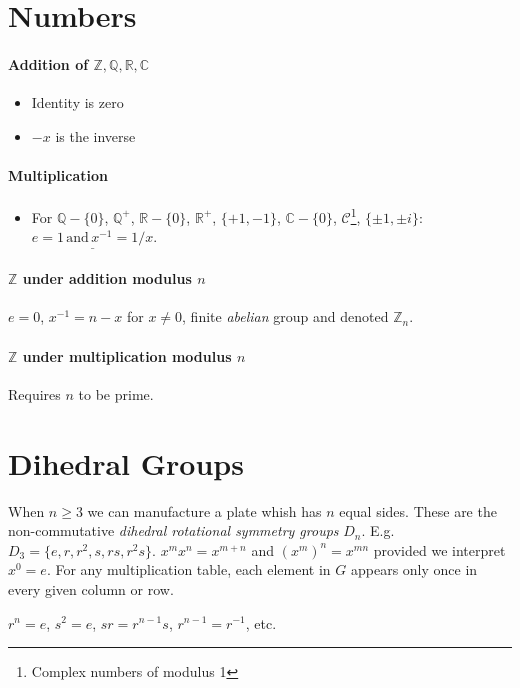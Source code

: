 \documentclass[a4paper,twocolumn,10pt]{article}
\begin{document}
  \section{Numbers}
  \paragraph{Addition of $\mathbb{Z}, \mathbb{Q}, \mathbb{R}, \mathbb{C}$}
  \begin{itemize}
    \item Identity is zero
    \item $-x$ is the inverse
  \end{itemize}
  \paragraph{Multiplication}
  \begin{itemize}
    \item For $\mathbb{Q}-\{0\}$, $\mathbb{Q}^+$, $\mathbb{R}-\{0\}$,
      $\mathbb{R}^+$,
      $\{+1,-1\}$, $\mathbb{C}-\{0\}$, $\mathcal{C}$\footnote{Complex numbers of
      modulus 1}, $\{\pm 1, \pm i\}$: $\underline{e=1 \,\text{and}\, x^{-1}=1/x}$.
  \end{itemize}

  \paragraph{$\mathbb{Z}$ under addition modulus $n$} $e=0$,
  $x^{-1}=n-x$ for $x\ne0$, finite \textit{abelian} group and denoted
  $\mathbb{Z}_n$.

  \paragraph{$\mathbb{Z}$ under multiplication modulus $n$} Requires $n$ to be
  prime.

  \section{Dihedral Groups}
  When $n\geqslant3$ we can manufacture a plate whish has $n$ equal sides. These are
  the non-commutative \textit{dihedral rotational symmetry groups} $D_n$. E.g.
  $D_3 = \{e,r,r^2,s,rs,r^2s\}$. $x^mx^n=x^{m+n}$ and $(x^m)^n=x^{mn}$ provided
  we interpret $x^0=e$. For any multiplication table, each element in $G$
  appears only once in every given column or row.

  $r^n=e$, $s^2=e$, $sr=r^{n-1}s$, $r^{n-1}=r^{-1}$, etc.
\end{document}
